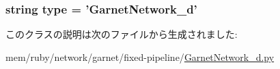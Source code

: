 \label{classGarnetNetwork__d_1_1GarnetNetwork__d_a17da7064bc5c518791f0c891eff05fda}
\hypertarget{classGarnetNetwork__d_1_1GarnetNetwork__d_acce15679d830831b0bbe8ebc2a60b2ca}{
\subsubsection[{type}]{\setlength{\rightskip}{0pt plus 5cm}string {\bf type} = '{\bf GarnetNetwork\_\-d}'}}
\label{classGarnetNetwork__d_1_1GarnetNetwork__d_acce15679d830831b0bbe8ebc2a60b2ca}


このクラスの説明は次のファイルから生成されました:\begin{DoxyCompactItemize}
\item 
mem/ruby/network/garnet/fixed-\/pipeline/\hyperlink{GarnetNetwork__d_8py}{GarnetNetwork\_\-d.py}\end{DoxyCompactItemize}

